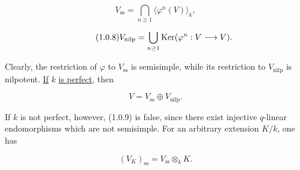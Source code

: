 \begin{equation}\tag{1.0.7}
V_{\mathrm{ss}}=
\bigcap_{n\geq1}\langle\varphi^n(V)\rangle_k,
\end{equation}

\begin{equation}\tag{1.0.8}
V_{\mathrm{nilp}}=
\bigcup_{n\geq1}\operatorname{Ker}(\varphi^n:V\longrightarrow V).
\end{equation}

Clearly, the restriction of $\varphi$ to $V_{\mathrm{ss}}$ is semisimple,
while its restriction to $V_{\mathrm{nilp}}$ is nilpotent. \underline{If} $k$ \underline{is
perfect}, then

\begin{equation}\tag{1.0.9}
V=V_{\mathrm{ss}}\oplus V_{\mathrm{nilp}}.
\end{equation}

If $k$ is not perfect, however, (1.0.9) is false, since there exist injective
$q$-linear endomorphisms which are not semisimple. For an arbitrary extension
$K/k$, one has

\begin{equation}\tag{1.0.10}
(V_K)_{\mathrm{ss}}=V_{\mathrm{ss}}\otimes_kK.
\end{equation}

